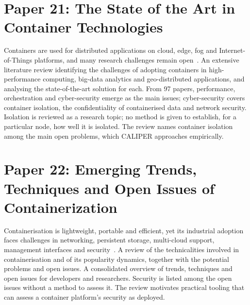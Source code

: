 \section{Paper 21: The State of the Art in Container Technologies}
\label{lit:casalicchio}

 Containers are used for distributed applications on cloud, edge, fog and Internet-of-Things platforms, and many research challenges remain open~\cite{casalicchio2020}.
 An extensive literature review identifying the challenges of adopting containers in high-performance computing, big-data analytics and geo-distributed applications, and analysing the state-of-the-art solution for each.
 From 97 papers, performance, orchestration and cyber-security emerge as the main issues; cyber-security covers container isolation, the confidentiality of containerised data and network security.
 Isolation is reviewed as a research topic; no method is given to establish, for a particular node, how well it is isolated.
 The review names container isolation among the main open problems, which CALIPER approaches empirically.

\section{Paper 22: Emerging Trends, Techniques and Open Issues of Containerization}
\label{lit:watada}

 Containerisation is lightweight, portable and efficient, yet its industrial adoption faces challenges in networking, persistent storage, multi-cloud support, management interfaces and security~\cite{watada2019}.
 A review of the technicalities involved in containerisation and of its popularity dynamics, together with the potential problems and open issues.
 A consolidated overview of trends, techniques and open issues for developers and researchers.
 Security is listed among the open issues without a method to assess it.
 The review motivates practical tooling that can assess a container platform's security as deployed.


